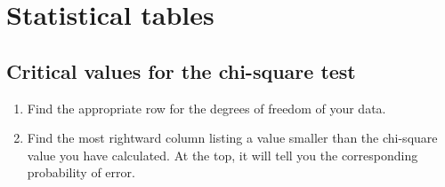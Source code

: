 \chapter{Statistical tables}
\label{sec:statisticaltables}

\section{Critical values for the chi-square test}
\label{sec:chisquarecriticalvalues}

\begin{enumerate}
  \item Find the appropriate row for the degrees of freedom of your data.
  \item Find the most rightward column listing a value smaller than the chi-square value you have calculated. At the top, it will tell you the corresponding probability of error.
\end{enumerate}

